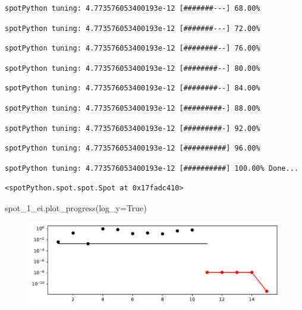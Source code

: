 \documentclass[
  letterpaper,
  DIV=11,
  numbers=noendperiod]{scrreprt}
\newenvironment{Shaded}{\begin{snugshade}}{\end{snugshade}}
\newcommand{\NormalTok}[1]{\textcolor[rgb]{0.00,0.23,0.31}{#1}}
\newcommand{\OperatorTok}[1]{\textcolor[rgb]{0.37,0.37,0.37}{#1}}
\newcommand{\VariableTok}[1]{\textcolor[rgb]{0.07,0.07,0.07}{#1}}
\begin{document}
\begin{verbatim}
spotPython tuning: 4.773576053400193e-12 [#######---] 68.00% 
\end{verbatim}

\begin{verbatim}
spotPython tuning: 4.773576053400193e-12 [#######---] 72.00% 
\end{verbatim}

\begin{verbatim}
spotPython tuning: 4.773576053400193e-12 [########--] 76.00% 
\end{verbatim}

\begin{verbatim}
spotPython tuning: 4.773576053400193e-12 [########--] 80.00% 
\end{verbatim}

\begin{verbatim}
spotPython tuning: 4.773576053400193e-12 [########--] 84.00% 
\end{verbatim}

\begin{verbatim}
spotPython tuning: 4.773576053400193e-12 [#########-] 88.00% 
\end{verbatim}

\begin{verbatim}
spotPython tuning: 4.773576053400193e-12 [#########-] 92.00% 
\end{verbatim}

\begin{verbatim}
spotPython tuning: 4.773576053400193e-12 [##########] 96.00% 
\end{verbatim}

\begin{verbatim}
spotPython tuning: 4.773576053400193e-12 [##########] 100.00% Done...
\end{verbatim}

\begin{verbatim}
<spotPython.spot.spot.Spot at 0x17fadc410>
\end{verbatim}

\begin{Shaded}
\begin{Highlighting}[]
\NormalTok{spot\_1\_ei.plot\_progress(log\_y}\OperatorTok{=}\VariableTok{True}\NormalTok{)}
\end{Highlighting}
\end{Shaded}

\begin{figure}[H]

{\centering \includegraphics{012_num_spot_ei_files/figure-pdf/cell-11-output-1.pdf}

}

\end{figure}
\end{document}
